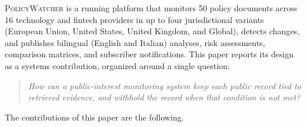 \documentclass[11pt]{article}
\newcommand{\pw}{\textsc{PolicyWatcher}}
\begin{document}
\pw{} is a running platform that monitors 50 policy documents across 16
technology and fintech providers in up to four jurisdictional variants
(European Union, United States, United Kingdom, and Global), detects changes,
and publishes bilingual (English and Italian) analyses, risk assessments,
comparison matrices, and subscriber notifications. This paper reports its design
as a systems contribution, organized around a single question:

\begin{quote}
\emph{How can a public-interest monitoring system keep each public record tied
to retrieved evidence, and withhold the record when that condition is not met?}
\end{quote}

\noindent The contributions of this paper are the following.
\end{document}
